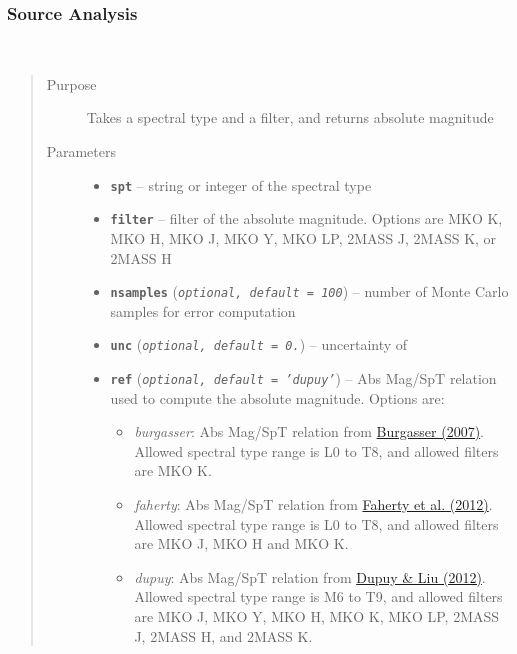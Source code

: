 \documentclass[letterpaper,10pt,english]{sphinxmanual}
\begin{document}
\subsubsection{Source Analysis}
\label{api:source-analysis}

\begin{fulllineitems}
\label{api:splat.typeToMag}~\begin{quote}\begin{description}
\item[{Purpose}] \leavevmode
Takes a spectral type and a filter, and returns absolute magnitude

\item[{Parameters}] \leavevmode\begin{itemize}
\item {} 
\textbf{\texttt{spt}} -- string or integer of the spectral type

\item {} 
\textbf{\texttt{filter}} -- filter of the absolute magnitude. Options are MKO K, MKO H, MKO J, MKO Y, MKO LP, 2MASS J, 2MASS K, or 2MASS H

\item {} 
\textbf{\texttt{nsamples}} (\emph{\texttt{optional, default = 100}}) -- number of Monte Carlo samples for error computation

\item {} 
\textbf{\texttt{unc}} (\emph{\texttt{optional, default = 0.}}) -- uncertainty of 

\item {} 
\textbf{\texttt{ref}} (\emph{\texttt{optional, default = 'dupuy'}}) -- 
Abs Mag/SpT relation used to compute the absolute magnitude. Options are:
\begin{itemize}
\item {} 
\emph{burgasser}: Abs Mag/SpT relation from \href{http://adsabs.harvard.edu/abs/2007ApJ...659..655B}{Burgasser (2007)}.
Allowed spectral type range is L0 to T8, and allowed filters are MKO K.

\item {} 
\emph{faherty}: Abs Mag/SpT relation from \href{http://adsabs.harvard.edu/abs/2012ApJ...752...56F}{Faherty et al. (2012)}.
Allowed spectral type range is L0 to T8, and allowed filters are MKO J, MKO H and MKO K.

\item {} 
\emph{dupuy}: Abs Mag/SpT relation from \href{http://adsabs.harvard.edu/abs/2012ApJS..201...19D}{Dupuy \& Liu (2012)}.
Allowed spectral type range is M6 to T9, and allowed filters are MKO J, MKO Y, MKO H, MKO K, MKO LP, 2MASS J, 2MASS H, and 2MASS K.


\end{itemize}
\end{itemize}
\end{description}
\end{quote}
\end{fulllineitems}
\end{document}
